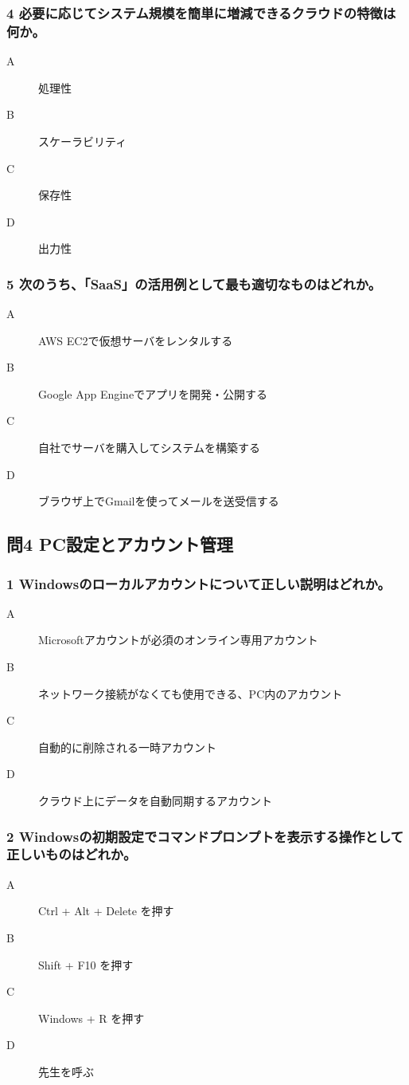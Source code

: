 \documentclass[a4paper,6pt]{jsarticle}
\begin{document}
\subsubsection*{4 必要に応じてシステム規模を簡単に増減できるクラウドの特徴は何か。}
\begin{description}
  \item[A] 処理性
  \item[B] スケーラビリティ
  \item[C] 保存性
  \item[D] 出力性
\end{description}

\subsubsection*{5 次のうち、「SaaS」の活用例として最も適切なものはどれか。}
\begin{description}
  \item[A] AWS EC2で仮想サーバをレンタルする
  \item[B] Google App Engineでアプリを開発・公開する
  \item[C] 自社でサーバを購入してシステムを構築する
  \item[D] ブラウザ上でGmailを使ってメールを送受信する
\end{description}

\vspace{-2mm}
\subsection*{問4 PC設定とアカウント管理}

\subsubsection*{1 Windowsのローカルアカウントについて正しい説明はどれか。}
\begin{description}
  \item[A] Microsoftアカウントが必須のオンライン専用アカウント
  \item[B] ネットワーク接続がなくても使用できる、PC内のアカウント
  \item[C] 自動的に削除される一時アカウント
  \item[D] クラウド上にデータを自動同期するアカウント
\end{description}

\subsubsection*{2 Windowsの初期設定でコマンドプロンプトを表示する操作として正しいものはどれか。}
\begin{description}
  \item[A] Ctrl + Alt + Delete を押す
  \item[B] Shift + F10 を押す
  \item[C] Windows + R を押す
  \item[D] 先生を呼ぶ
\end{description}
\end{document}
